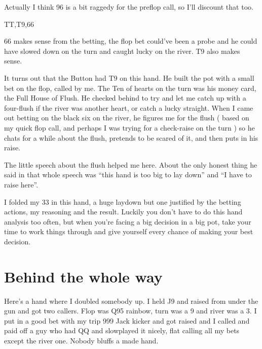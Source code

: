 Actually I think 96 is a bit raggedy for the preflop call, so I'll
discount that too.

TT,T9,66

66 makes sense from the betting, the flop bet could've been a probe
and he could have slowed down on the turn and caught lucky on the river.
T9 also makes sense.

It turns out that the Button had T9 on this hand.
He built the pot with a small bet on the flop, called by me.
The Ten of hearts on the turn was his money card, the
Full House of Flush. He checked behind
to try and let me catch up with a four-flush if the river was
another heart, or catch a lucky straight.
When I came out betting on the black six on
the river, he figures me for the flush ( based on my quick
flop call, and perhaps I was trying for a check-raise on the turn )
so he chats for a while about the flush, pretends to be scared of it,
and then puts in his raise.

The little speech about the flush helped me here. About
the only honest thing he said in that whole speech was
``this hand is too big to lay down'' and ``I have to raise here''.

I folded my 33 in this hand, a huge laydown but one
justified by the betting actions, my reasoning and the result.
Luckily you don't have to do this hand analysis too often, but
when you're facing a big decision in a big pot, take your time to
work things through and give yourself every chance of making your best
decision.

\section{Behind the whole way}

Here's a hand where I doubled somebody up. I held J9 and raised from
under the gun and got two callers. Flop was
Q95 rainbow, turn was a 9 and river was a 3. I put in a good bet
with my trip 999 Jack kicker and got raised and I called and paid off
a guy who had QQ and slowplayed it nicely, flat calling all my bets
except the river one. Nobody bluffs a made hand.


